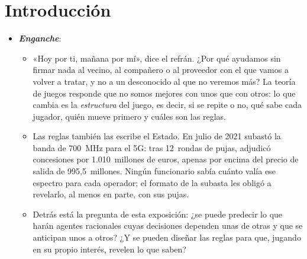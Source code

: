 \documentclass[11pt]{article}
\begin{document}
\tceetitulo

\section*{Introducción}

\begin{itemize}
\item \textbf{\emph{Enganche}}:
  \begin{itemize}
  \item «Hoy por ti, mañana por mí», dice el refrán. ¿Por qué ayudamos sin firmar nada al vecino, al compañero o al proveedor con el que vamos a volver a tratar, y no a un desconocido al que no veremos más? La teoría de juegos responde que no somos mejores con unos que con otros: lo que cambia es la \emph{estructura} del juego, es decir, si se repite o no, qué sabe cada jugador, quién mueve primero y cuáles son las reglas.
  \item Las reglas también las escribe el Estado. En julio de 2021 subastó la banda de 700~MHz para el 5G: tras 12~rondas de pujas, adjudicó concesiones por 1.010~millones de euros\nocite{MINECO2021Subasta700}, apenas por encima del precio de salida de 995,5~millones\nocite{MINECO2021Subasta700Jornada}. Ningún funcionario sabía cuánto valía ese espectro para cada operador; el formato de la subasta les obligó a revelarlo, al menos en parte, con sus pujas.
  \item Detrás está la pregunta de esta exposición: ¿se puede predecir lo que harán agentes racionales cuyas decisiones dependen unas de otras y que se anticipan unos a otros? ¿Y se pueden diseñar las reglas para que, jugando en su propio interés, revelen lo que saben?
  \end{itemize}


\end{itemize}
\end{document}
